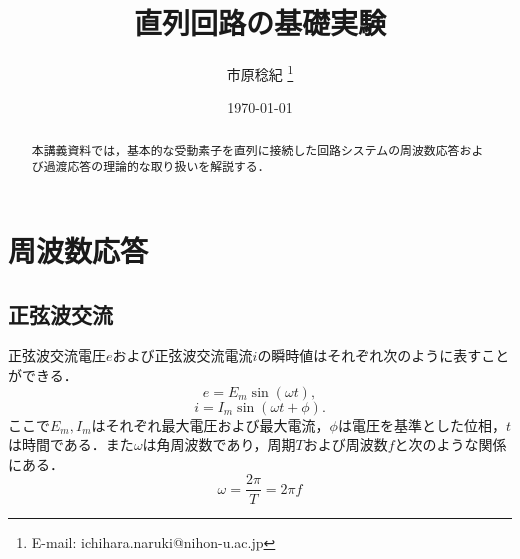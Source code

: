 \documentclass[10.5ptj, a4paper, uplatex, dvipdfmx]{jsarticle}
\title{直列回路の基礎実験}
\author{市原稔紀 \thanks{E-mail: ichihara.naruki@nihon-u.ac.jp}}
\date{\today}
\begin{document}
\maketitle
\begin{abstract}
    本講義資料では，基本的な受動素子を直列に接続した回路システムの周波数応答および過渡応答の理論的な取り扱いを解説する．
\end{abstract}
\section{周波数応答}
\subsection{正弦波交流}
正弦波交流電圧$e$および正弦波交流電流$i$の瞬時値はそれぞれ次のように表すことができる．
\begin{equation}
    e = E_m\sin(\omega t),
\end{equation}
\begin{equation}
    i = I_m\sin(\omega t + \phi).
\end{equation}
ここで$E_m, I_m$はそれぞれ最大電圧および最大電流，$\phi$は電圧を基準とした位相，$t$は時間である．また$\omega$は角周波数であり，周期$T$および周波数$f$と次のような関係にある．
\begin{equation}
    \omega = \frac{2\pi}{T}=2\pi f
\end{equation}
\end{document}
